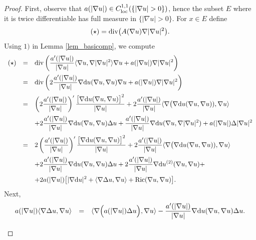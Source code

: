 \documentclass[10 pt,a4paper]{article}
\theoremstyle{definition}
\begin{document}
\begin{proof}
	First, observe that $a(|\nabla u|) \in C^{1,1}_\loc(\{|\nabla u|>0\})$, hence the subset $E$ where it is twice differentiable has full measure in $\{|\nabla u|>0\}$. For $x \in E$ define
	\[
		(\star) = \mathrm{div}\big( A(\nabla u) \nabla |\nabla u|^2 \big). 
	\]
	Using $1)$ in Lemma \ref{lem_basicomp}, we compute 
	$$
		\begin{array}{lcl}
			(\star) & = & \displaystyle \mathrm{div} \left( \frac{a'(|\nabla u|)}{|\nabla u|} \langle \nabla u , \nabla |\nabla u|^2 \rangle \nabla u + a(|\nabla u|) \nabla |\nabla u|^2\right) \\[0.4cm]
			& = & \displaystyle \mathrm{div} \left( 2\frac{a'(|\nabla u|)}{|\nabla u|} \nabla \mathrm{d}  u(\nabla u, \nabla u) \nabla u + a(|\nabla u|) \nabla |\nabla u|^2\right) \\[0.4cm]
			& = & \displaystyle \left( 2\frac{a'(|\nabla u|)}{|\nabla u|}\right)' \frac{\big[\nabla \mathrm{d}  u(\nabla u, \nabla u)\big]^2}{|\nabla u|} + 2\frac{a'(|\nabla u|)}{|\nabla u|} \langle \nabla \big(\nabla \mathrm{d}  u(\nabla u, \nabla u)), \nabla u \rangle\\[0.4cm]
			& & \displaystyle + 2\frac{a'(|\nabla u|)}{|\nabla u|} \nabla \mathrm{d}  u(\nabla u, \nabla u) \Delta u + \frac{a'(|\nabla u|)}{|\nabla u|} \nabla \mathrm{d}  u( \nabla u, \nabla |\nabla u|^2) + a(|\nabla u|) \Delta|\nabla u|^2\\[0.4cm]
			& = & \displaystyle 2\left(\frac{a'(|\nabla u|)}{|\nabla u|}\right)' \frac{\big[\nabla \mathrm{d}  u(\nabla u, \nabla u)\big]^2}{|\nabla u|} + 2\frac{a'(|\nabla u|)}{|\nabla u|} \langle \nabla \big(\nabla \mathrm{d}  u(\nabla u, \nabla u)), \nabla u \rangle\\[0.4cm]
			& & \displaystyle + 2\frac{a'(|\nabla u|)}{|\nabla u|} \nabla \mathrm{d}  u(\nabla u, \nabla u) \Delta u + 2\frac{a'(|\nabla u|)}{|\nabla u|} \nabla \mathrm{d} u^{(2)}(\nabla u, \nabla u) + \\[0.4cm]
			& & + \displaystyle 2a(|\nabla u|) \big[ |\nabla \mathrm{d}  u|^2 + \langle \nabla \Delta u, \nabla u \rangle + \mathrm{Ric}(\nabla u, \nabla u)\big].
		\end{array}
	$$
	Next, 
	\begin{equation}\label{dos}
		\begin{array}{lcl}
			\displaystyle a(|\nabla u|) \langle \nabla \Delta u, \nabla u \rangle & = & \displaystyle \langle \nabla \Big(a(|\nabla u|)\Delta u\Big), \nabla u \rangle - \frac{a'(|\nabla u|)}{|\nabla u|}\nabla \mathrm{d}  u(\nabla u, \nabla u) \Delta u. \\[0.4cm]
		\end{array}
	\end{equation}

\end{proof}
\end{document}
